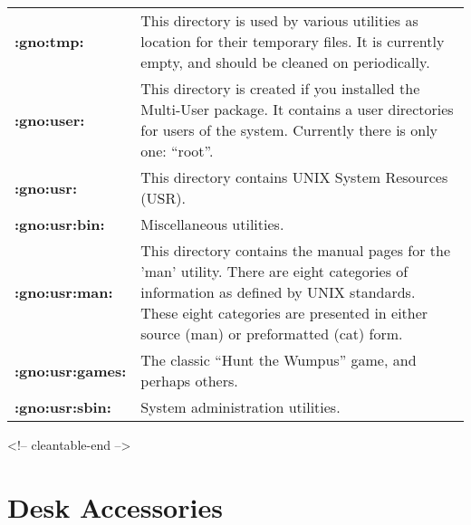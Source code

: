 \documentclass{report}
\begin{document}
\begin{tabular}{ll}
\bf :gno:tmp: \rm	& 
\begin{minipage}[t]{8cm}
	This directory is used by various utilities as location for
	their temporary files.  It is currently empty, and should
	be cleaned on periodically.
\end{minipage} \hfill \\

\bf :gno:user: \rm	& 
\begin{minipage}[t]{8cm}
	This directory is created if you installed the Multi-User package.
	It contains a user directories for users of the system.
	Currently there is only one: ``root''. 
\end{minipage} \hfill \\

\bf :gno:usr: \rm	& 
\begin{minipage}[t]{8cm}
	This directory contains UNIX System Resources (USR).
\end{minipage} \hfill \\

\bf :gno:usr:bin: \rm	& 
\begin{minipage}[t]{8cm}
	Miscellaneous utilities.
\end{minipage} \hfill \\

\bf :gno:usr:man: \rm	& 
\begin{minipage}[t]{8cm}
	This directory contains the manual pages for the 'man' utility.
	There are eight categories of information as defined by UNIX
	standards. These eight categories are presented in either
	source (man) or preformatted (cat) form.
\end{minipage} \hfill \\

\bf :gno:usr:games: \rm	& 
\begin{minipage}[t]{8cm}
	The classic ``Hunt the Wumpus'' game, and perhaps others.
\end{minipage} \hfill \\

\bf :gno:usr:sbin: \rm	& 
\begin{minipage}[t]{8cm}
	System administration utilities.
\end{minipage} \hfill \\

\end{tabular}
\begin{rawhtml}
<!-- cleantable-end -->
\end{rawhtml}

\chapter{Desk Accessories}
\end{document}
